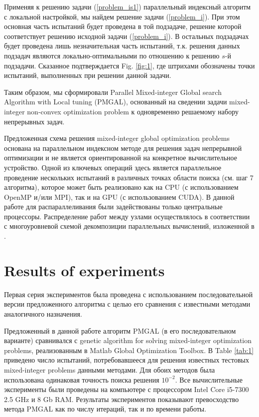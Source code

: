 \documentclass[
11pt,%
tightenlines,%
twoside,%
onecolumn,%
nofloats,%
nobibnotes,%
nofootinbib,%
superscriptaddress,%
noshowpacs,%
centertags]%
{revtex4}
\begin{document}
Применяя к решению задачи (\ref{problem_is1}) параллельный индексный алгоритм с локальной настройкой, мы найдем решение задачи (\ref{problem_i}). При этом основная часть испытаний будет проведена в той подзадаче, решение которой соответствует решению исходной задачи (\ref{problem_i}). В остальных подзадачах будет проведена лишь незначительная часть испытаний, т.к. решения данных подзадач являются локально-оптимальными по отношению к решению $s$-й подзадачи. Сказанное подтверждается Fig. \ref{fig:1}, где штрихами обозначены точки испытаний, выполненных при решении данной задачи.

Таким образом, мы сформировали Parallel Mixed-integer Global search Algorithm with Local tuning (PMGAL), основанный на сведении задачи mixed-integer non-convex optimization problem к одновременно решаемому набору непрерывных задач.

Предложенная схема решения mixed-integer global optimization problems основана на параллельном индексном методе для решения задач непрерывной оптимизации и не является ориентированной на конкретное вычислительное устройство. Одной из ключевых операций здесь является параллельное проведение нескольких испытаний в различных точках области поиска (см. шаг 7 алгоритма), которое может быть реализовано как на CPU (с использованием OpenMP и/или MPI), так и на GPU (с использованием CUDA). 
В данной работе для распараллеливания были задействованы только центральные процессоры. Распределение работ между узлами осуществлялось в соответствии с многоуровневой схемой декомпозиции параллельных вычислений, изложенной в \cite{Strongin2018,Barkalov2020}.

\section{Results of experiments}


Первая серия экспериментов была проведена с использованием последовательной версии предложенного алгоритма с целью его сравнения с известными методами аналогичного назначения.

Предложенный в данной работе алгоритм PMGAL (в его последовательном варианте) сравнивался с genetic algorithm for solving mixed-integer optimization problems, реализованным в Matlab Global Optimization Toolbox. В Table \ref{tab:1} приведено число испытаний, потребовавшееся для решения известных тестовых mixed-integer problems данными методами. Для обоих методов была использована одинаковая точность поиска решения $10^{-2}$. Все вычислительные эксперименты были проведены на компьютере с процессором Intel Core i5-7300 2.5 GHz и 8 Gb RAM. Результаты экспериментов показывают превосходство метода PMGAL как по числу итераций, так и по времени работы.
\end{document}
